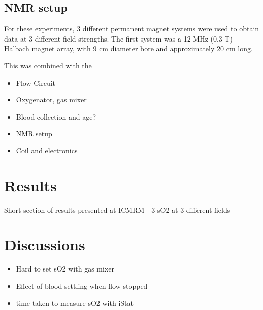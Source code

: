 \subsection{NMR setup}
For these experiments, 3 different permanent magnet systems were used to obtain data at 3 different field strengths.
The first system was a 12 MHz (0.3 T) Halbach magnet array, with 9 cm diameter bore and approximately 20 cm long.

This was combined with the


\begin{itemize}
\item Flow Circuit
\item Oxygenator, gas mixer
\item Blood collection and age?
\item NMR setup
\item Coil and electronics
\end{itemize}

\section{Results}
Short section of results presented at ICMRM - 3 sO2 at 3 different fields
\section{Discussions}

\begin{itemize}
\item Hard to set sO2 with gas mixer
\item Effect of blood settling when flow stopped
\item time taken to measure sO2 with iStat
\end{itemize}
